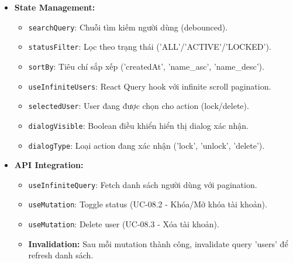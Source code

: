 \begin{itemize}
\begin{itemize}
            \item \textbf{Stats Cards:} Grid 3 cột với background gradient nhẹ, icon size 32, số liệu size 24 bold.
        \end{itemize}
    \item \textbf{State Management:}
        \begin{itemize}
            \item \texttt{searchQuery}: Chuỗi tìm kiếm người dùng (debounced).
            \item \texttt{statusFilter}: Lọc theo trạng thái ('ALL'/'ACTIVE'/'LOCKED').
            \item \texttt{sortBy}: Tiêu chí sắp xếp ('createdAt', 'name\_asc', 'name\_desc').
            \item \texttt{useInfiniteUsers}: React Query hook với infinite scroll pagination.
            \item \texttt{selectedUser}: User đang được chọn cho action (lock/delete).
            \item \texttt{dialogVisible}: Boolean điều khiển hiển thị dialog xác nhận.
            \item \texttt{dialogType}: Loại action đang xác nhận ('lock', 'unlock', 'delete').
        \end{itemize}
    \item \textbf{API Integration:}
        \begin{itemize}
            \item \texttt{useInfiniteQuery}: Fetch danh sách người dùng với pagination.
            \item \texttt{useMutation}: Toggle status (UC-08.2 - Khóa/Mở khóa tài khoản).
            \item \texttt{useMutation}: Delete user (UC-08.3 - Xóa tài khoản).
            \item \textbf{Invalidation:} Sau mỗi mutation thành công, invalidate query 'users' để refresh danh sách.
        \end{itemize}
\end{itemize}


